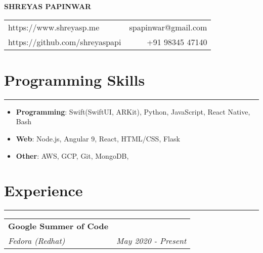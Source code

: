 \documentclass[a4paper,6pt]{article}
\begin{document}
\begin{center}
\Large \textbf{SHREYAS PAPINWAR}


\end{center}
\begin{tabularx}{\textwidth}{X r}
	https://www.shreyasp.me &  spapinwar@gmail.com \vspace{2px} \\
	https://github.com/shreyaspapi & +91 98345 47140 
\end{tabularx}


\vspace{-9px}
\section*{Programming Skills}
\vspace{-8px}
\hrule
\vspace{8px}
\begin{itemize}
 \item \hspace{3px} \textbf{Programming}: \small Swift(SwiftUI, ARKit), Python, JavaScript, React Native, Bash
\normalsize
\vspace{2px}
	\item \hspace{3px} \textbf{Web}: \small Node.js, Angular 9, React, HTML/CSS, Flask
\normalsize
\vspace{2px}
	\item \hspace{3px} \textbf{Other}: \small AWS, GCP, Git, MongoDB, 
\normalsize
\end{itemize}



\vspace{-9px}
\section*{Experience}
\vspace{-8px}
\hrule

\vspace{7px}
\hspace{5px}
\begin{tabularx}{\textwidth}{X r}
	\large{\textbf{Google Summer of Code}} \vspace{1px} & \\
	\textit{\small Fedora (Redhat)}& \textit{May 2020 - Present} \\
\end{tabularx}
\end{document}
